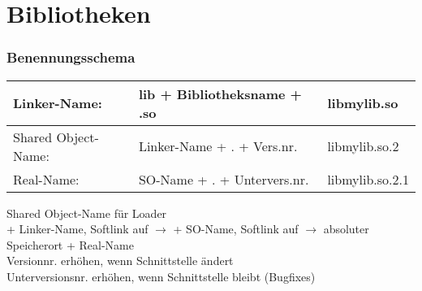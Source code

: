 \section{Bibliotheken}





\subsubsection{Benennungsschema}
\begin{tabular}{|l|l|l|}
\hline
   Linker-Name:  & lib + Bibliotheksname + .so & libmylib.so\\
   \hline
   Shared Object-Name: & Linker-Name + . + Vers.nr. & libmylib.so.2\\
   \hline
   Real-Name: & SO-Name + . + Untervers.nr. & libmylib.so.2.1\\
   \hline
\end{tabular}
Shared Object-Name für Loader\\
 + Linker-Name, Softlink auf $\rightarrow$  + SO-Name, Softlink auf $\rightarrow$ absoluter Speicherort  + Real-Name\\
Versionnr. erhöhen, wenn Schnittstelle ändert\\
Unterversionsnr. erhöhen, wenn Schnittstelle bleibt (Bugfixes)


